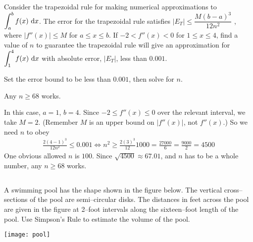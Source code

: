 




\begin{Mquestion}[2014A]
Consider the trapezoidal rule for making numerical approximations to
$\displaystyle\int_a^b f(x)\ \mathrm{d}x$. The error for the trapezoidal rule satisfies
$|E_T| \le \dfrac{ M(b - a)^3}{12n^2}$ , where $|f''(x)| \le M$
for $a \le x \le b$. If $-2 < f''(x) < 0$ for $1 \le x \le 4$,
find a value of $n$ to guarantee the trapezoidal rule will give
an approximation for $\displaystyle\int_1^4 f(x)\ \mathrm{d}x$ with absolute error,
$|E_T|$, less than $0.001$.
\end{Mquestion}

\begin{hint}
Set the error bound to be less than $0.001$, then solve for $n$.
\end{hint}

\begin{answer}
Any  $n\ge 68$ works.
\end{answer}

\begin{solution}
 In this case, $a=1$, $b=4$. Since $-2 \leq f''(x) \leq 0$  over the relevant interval,  we take $M=2$. (Remember $M$ is an upper bound on $|f''(x)|$, not $f''(x)$.) So we need $n$
to obey
\begin{align*}
\frac{ 2(4 - 1)^3}{12n^2} \le 0.001
\iff n^2\ge \frac{2(3)^3}{12} 1000 =\frac{27000}{6}=\frac{9000}{2}=4500
\end{align*}
One obvious allowed $n$ is $100$. Since $\sqrt{4500} \approx 67.01$, and $n$ has to be a whole number,
any  $n\ge 68$ works.
\end{solution}




\subsection*{\Application}

\begin{question}[1996A]
 A swimming pool has the shape shown in the figure below.
The vertical cross--sections of the pool are semi--circular disks. The
distances in feet across the pool are given in the figure at 2--foot intervals along
the sixteen--foot length of the pool. Use Simpson's Rule to estimate the
volume of the pool.

\begin{center}
       \texttt{[image: pool]}
\end{center}

\end{question}

